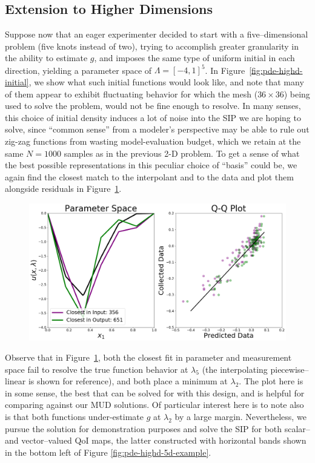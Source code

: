\FloatBarrier
\subsection{Extension to Higher Dimensions}

Suppose now that an eager experimenter decided to start with a five--dimensional problem (five knots instead of two), trying to accomplish greater granularity in the ability to estimate $g$, and imposes the same type of uniform initial in each direction, yielding a parameter space of $\Lambda = [-4, 1]^5$.
In Figure~\ref{fig:pde-highd-initial}, we show what such initial functions would look like, and note that many of them appear to exhibit fluctuating behavior for which the mesh ($36\times36$) being used to solve the problem, would not be fine enough to resolve.
In many senses, this choice of initial density induces a lot of noise into the SIP we are hoping to solve, since ``common sense'' from a modeler's perspective may be able to rule out zig-zag functions from wasting model-evaluation budget, which we retain at the same $N=1000$ samples as in the previous 2-D problem.
To get a sense of what the best possible representations in this peculiar choice of ``basis'' could be, we again find the closest match to the interpolant and to the data and plot them alongside residuals in Figure~\ref{fig:pde-5d-proj}.

\begin{figure}[htbp]
\centering
  \includegraphics[width=0.675\linewidth]{figures/pde-highd/pde-highd_proj_D5}
\caption{
}
\label{fig:pde-5d-proj}
\end{figure}

Observe that in Figure~\ref{fig:pde-5d-proj}, both the closest fit in parameter and measurement space fail to resolve the true function behavior at $\lambda_5$ (the interpolating piecewise--linear is shown for reference), and both place a minimum at $\lambda_2$.
The plot here is in some sense, the best that can be solved for with this design, and is helpful for comparing against our MUD solutions.
Of particular interest here is to note also is that both functions under-estimate $g$ at $\lambda_2$ by a large margin.
Nevertheless, we pursue the solution for demonstration purposes and solve the SIP for both scalar-- and vector--valued QoI maps, the latter constructed with horizontal bands shown in the bottom left of Figure \ref{fig:pde-highd-5d-example}.

